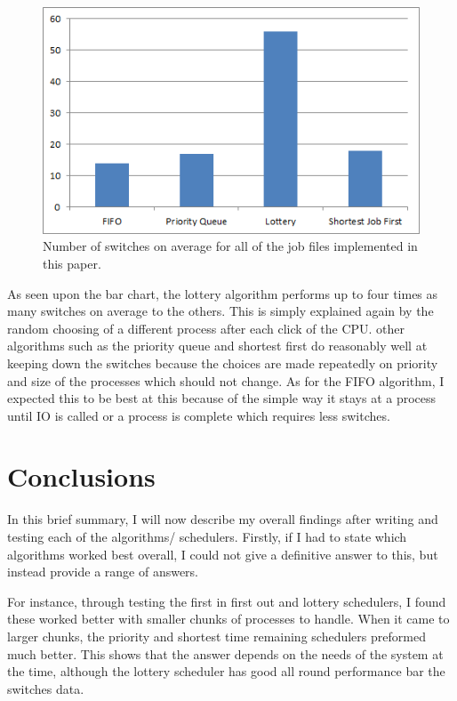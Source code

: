 \documentclass{sig-alternate}
\begin{document}
\begin{figure}[!h]
\centering
\includegraphics[scale=0.6]{images/compare2.png}
\caption{Number of switches on average for all of the job files implemented in
this paper.}
\end{figure}

As seen upon the bar chart, the lottery algorithm performs up to four times as
many switches on average to the others. This is simply explained again by the
random choosing of a different process after each click of the CPU. other
algorithms such as the priority queue and shortest first do reasonably well at
keeping down the switches because the choices are made repeatedly on priority
and size of the processes which should not change. As for the FIFO algorithm, I
expected this to be best at this because of the simple way it stays at a process
until IO is called or a process is complete which requires less switches.

\section{Conclusions}
In this brief summary, I will now describe my overall findings after writing and
testing each of the algorithms/ schedulers. Firstly, if I had to state which
algorithms worked best overall, I could not give a definitive answer to this, but
instead provide a range of answers. 

For instance, through testing the first in first out and lottery schedulers, I
found these worked better with smaller chunks of processes to handle. When it
came to larger chunks, the priority and shortest time remaining schedulers
preformed much better. This shows that the answer depends on the needs of the
system at the time, although the lottery scheduler has good all round
performance bar the switches data.
\end{document}
